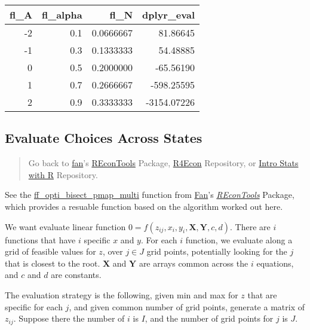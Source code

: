 \documentclass[
]{book}
\begin{document}
\begin{table}[!h]
\centering
\begin{tabular}{r|r|r|r}
\hline
fl\_A & fl\_alpha & fl\_N & dplyr\_eval\\
\hline
\rowcolor{gray!6}  -2 & 0.1 & 0.0666667 & 81.86645\\
\hline
-1 & 0.3 & 0.1333333 & 54.48885\\
\hline
\rowcolor{gray!6}  0 & 0.5 & 0.2000000 & -65.56190\\
\hline
1 & 0.7 & 0.2666667 & -598.25595\\
\hline
\rowcolor{gray!6}  2 & 0.9 & 0.3333333 & -3154.07226\\
\hline
\end{tabular}
\end{table}

\hypertarget{evaluate-choices-across-states}{%
\subsection{Evaluate Choices Across States}\label{evaluate-choices-across-states}}

\begin{quote}
Go back to \href{http://fanwangecon.github.io/CodeDynaAsset/}{fan}'s \href{https://fanwangecon.github.io/REconTools/}{REconTools} Package, \href{https://fanwangecon.github.io/R4Econ/}{R4Econ} Repository, or \href{https://fanwangecon.github.io/Stat4Econ/}{Intro Stats with R} Repository.
\end{quote}

See the \href{https://fanwangecon.github.io/REconTools/reference/ff_opti_bisect_pmap_multi.html}{ff\_opti\_bisect\_pmap\_multi} function from \href{https://fanwangecon.github.io/}{Fan}'s \emph{\href{https://fanwangecon.github.io/REconTools/}{REconTools}} Package, which provides a resuable function based on the algorithm worked out here.

We want evaluate linear function \(0=f(z_{ij}, x_i, y_i, \textbf{X}, \textbf{Y}, c, d)\). There are \(i\) functions that have \(i\) specific \(x\) and \(y\). For each \(i\) function, we evaluate along a grid of feasible values for \(z\), over \(j\in J\) grid points, potentially looking for the \(j\) that is closest to the root. \(\textbf{X}\) and \(\textbf{Y}\) are arrays common across the \(i\) equations, and \(c\) and \(d\) are constants.

The evaluation strategy is the following, given min and max for \(z\) that are specific for each \(j\), and given common number of grid points, generate a matrix of \(z_{ij}\). Suppose there the number of \(i\) is \(I\), and the number of grid points for \(j\) is \(J\).
\end{document}
